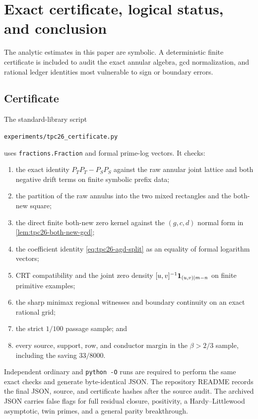 \section{Exact certificate, logical status, and conclusion}
\label{sec:tpc26-certificate-scope}

The analytic estimates in this paper are symbolic.  A deterministic
finite certificate is included to audit the exact annular algebra,
gcd normalization, and rational ledger identities most vulnerable to
sign or boundary errors.

\subsection{Certificate}

The standard-library script

\begin{center}
 \texttt{experiments/tpc26\_certificate.py}
\end{center}

uses \texttt{fractions.Fraction} and formal prime-log vectors.  It
checks:

\begin{enumerate}[label=\textup{(\arabic*)}]
 \item the exact identity
 \(P_TP_T-P_SP_S\) against the raw annular joint lattice and both
 negative drift terms on finite symbolic prefix data;
 \item the partition of the raw annulus into the two mixed rectangles
 and the both-new square;
 \item the direct finite both-new zero kernel against the
 \((g,c,d)\) normal form in \cref{lem:tpc26-both-new-gcd};
 \item the coefficient identity
 \eqref{eq:tpc26-agd-split} as an equality of formal logarithm vectors;
 \item CRT compatibility and the joint zero density
 \([u,v]^{-1}\mathbf 1_{(u,v)\mid m-n}\) on finite primitive examples;
 \item the sharp minimax regional witnesses and boundary continuity on
 an exact rational grid;
 \item the strict \(1/100\) passage sample; and
 \item every source, support, row, and conductor margin in the
 \(\beta>2/3\) sample, including the saving \(33/8000\).
\end{enumerate}

Independent ordinary and \texttt{python -O} runs are required to
perform the same exact checks and generate byte-identical JSON.  The
repository README records the final JSON, source, and certificate
hashes after the source audit.  The archived JSON carries false flags
for full residual closure, positivity, a Hardy--Littlewood asymptotic,
twin primes, and a general parity breakthrough.

